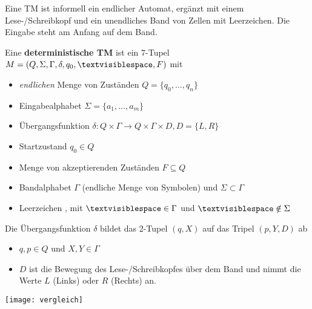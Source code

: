 
Eine TM ist informell ein endlicher Automat, ergänzt mit einem Lese-/Schreibkopf und ein unendliches Band von Zellen mit Leerzeichen.
Die Eingabe steht am Anfang auf dem Band.

Eine \textbf{deterministische TM} ist ein 7-Tupel $M = (Q, \Sigma, \Gamma, \delta, q_0, \textvisiblespace, F)$ mit
\begin{itemize}
    \item \emph{endlichen} Menge von Zuständen $Q = \{q_0, \dots, q_n\}$
    \item Eingabealphabet $\Sigma = \{a_1, \dots, a_m\}$
    \item Übergangsfunktion $\delta: Q \times \Gamma \rightarrow Q \times \Gamma \times D, D =\{L,R\}$
    \item Startzustand $q_0 \in Q$
    \item Menge von akzeptierenden Zuständen $F \subseteq Q$
    \item Bandalphabet $\Gamma$ (endliche Menge von Symbolen) und $\Sigma \subset \Gamma$
    \item Leerzeichen \textvisiblespace, mit $\textvisiblespace \in \Gamma$ und $\textvisiblespace \notin \Sigma$
\end{itemize}

Die Übergangsfunktion $\delta$ bildet das 2-Tupel $(q, X)$ auf das Tripel $(p, Y, D)$ ab
\begin{itemize}
    \item $q,p \in Q$ und $X, Y \in \Gamma$
    \item $D$ ist die Bewegung des Lese-/Schreibkopfes über dem Band und nimmt die Werte $L$ (Links) oder $R$ (Rechts) an.
\end{itemize}



\texttt{[image: vergleich]}%